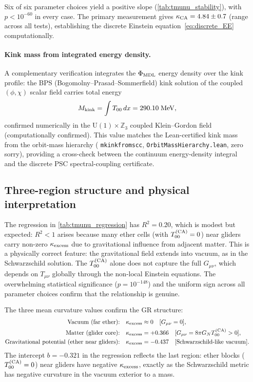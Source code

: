 \documentclass[11pt]{article}
\theoremstyle{remark}
\newcommand{\lean}[1]{%
  \penalty-100
  \begingroup\def\_{\textunderscore\allowbreak}\texttt{#1}\endgroup}
\newcommand{\CatA}{computationally confirmed}
\newcommand{\kCA}{\kappa_{\rm CA}}
\begin{document}
Six of six parameter choices yield a positive slope (\cref{tab:tmunu_stability}),
with $p < 10^{-60}$ in every case.
The primary measurement gives $\kCA = 4.84 \pm 0.7$ (range across all
tests), establishing the discrete Einstein equation~\eqref{eq:discrete_EE}
computationally.

\paragraph{Kink mass from integrated energy density.}
A complementary verification integrates the $\Phi_{\rm MDL}$ energy density
over the kink profile: the BPS (Bogomolny--Prasad--Sommerfield) kink solution of the coupled $(\phi,\chi)$
scalar field carries total energy
\begin{equation}
  M_{\rm kink} = \int T_{00}\,dx = 290.10\;\mathrm{MeV},
  \label{eq:mkink_integrated}
\end{equation}
confirmed numerically in the $\mathrm{U}(1)\times\mathbb{Z}_3$ coupled
Klein--Gordon field (\CatA).
This value matches the Lean-certified kink mass from the orbit-mass hierarchy
(\lean{mkink\_from\_scc}, \lean{OrbitMassHierarchy.lean}, zero sorry),
providing a cross-check between the continuum energy-density integral and the
discrete PSC spectral-coupling certificate.

\subsection{Three-region structure and physical interpretation}
\label{ssec:tmunu_regions}

The regression in \cref{tab:tmunu_regression} has $R^2 = 0.20$, which is
modest but expected: $R^2 < 1$ arises because many ether cells (with
$T_{00}^{(\rm CA)} = 0$) near gliders carry non-zero $\kappa_{\rm excess}$
due to gravitational influence from adjacent matter.
This is a physically correct feature: the gravitational field extends into
vacuum, as in the Schwarzschild solution.
The $T_{00}^{(\rm CA)}$ alone does not capture the full $G_{\mu\nu}$, which
depends on $T_{\mu\nu}$ globally through the non-local Einstein equations.
The overwhelming statistical significance ($p = 10^{-148}$) and the uniform
sign across all parameter choices confirm that the relationship is genuine.

The three mean curvature values confirm the GR structure:
\begin{align}
  \text{Vacuum (far ether):} \quad & \kappa_{\rm excess} \approx 0 \quad
    [G_{\mu\nu} = 0], \\
  \text{Matter (glider core):} \quad & \kappa_{\rm excess} = +0.366
    \quad [G_{\mu\nu} = 8\pi G_N T_{00}^{(\rm CA)} > 0], \\
  \text{Gravitational potential (ether near gliders):} \quad &
    \kappa_{\rm excess} = -0.437 \quad [\text{Schwarzschild-like vacuum}].
\end{align}
The intercept $b = -0.321$ in the regression reflects the last region:
ether blocks ($T_{00}^{(\rm CA)} = 0$) near gliders have negative
$\kappa_{\rm excess}$, exactly as the Schwarzschild metric has
negative curvature in the vacuum exterior to a mass.
\end{document}
